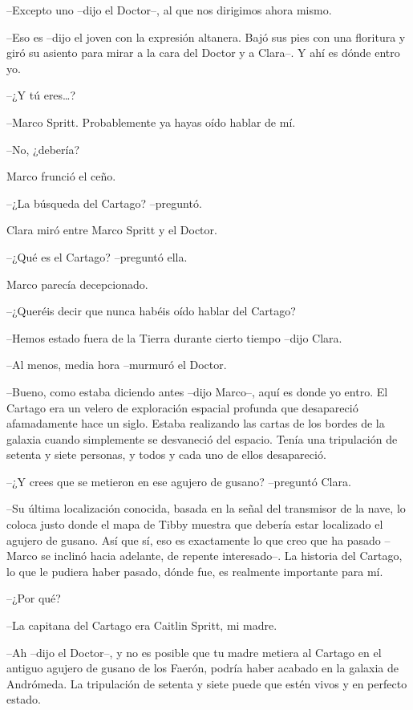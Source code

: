 {--Excepto uno --dijo el Doctor--, al que nos dirigimos ahora mismo.}

{--Eso es --dijo el joven con la expresión altanera. Bajó sus pies con
 una floritura y giró su asiento para mirar a la cara del Doctor y a
Clara--. Y ahí es dónde entro yo.}

{--¿Y tú eres\ldots{}?}

{--Marco Spritt. Probablemente ya hayas oído hablar de mí.}

{--No, ¿debería?}

{Marco frunció el ceño.}

{--¿La búsqueda del Cartago? --preguntó.}

{Clara miró entre Marco Spritt y el Doctor.}

{--¿Qué es el Cartago? --preguntó ella.}

{Marco parecía decepcionado.}

{--¿Queréis decir que nunca habéis oído hablar del Cartago?}

{--Hemos estado fuera de la Tierra durante cierto tiempo --dijo Clara.}

{--Al menos, media hora --murmuró el Doctor.}

{--Bueno, como estaba diciendo antes --dijo Marco--, aquí es donde yo
 entro. El Cartago era un velero de exploración espacial profunda que
 desapareció afamadamente hace un siglo. Estaba realizando las cartas de
 los bordes de la galaxia cuando simplemente se desvaneció del espacio.
 Tenía una tripulación de setenta y siete personas, y todos y cada uno de
ellos desapareció.}

{--¿Y crees que se metieron en ese agujero de gusano? --preguntó Clara.}

{--Su última localización conocida, basada en la señal del transmisor de
 la nave, lo coloca justo donde el mapa de Tibby muestra que debería
 estar localizado el agujero de gusano. Así que sí, eso es exactamente lo
 que creo que ha pasado --Marco se inclinó hacia adelante, de repente
 interesado--. La historia del Cartago, lo que le pudiera haber pasado,
dónde fue, es realmente importante para mí.}

{--¿Por qué?}

{--La capitana del Cartago era Caitlin Spritt, mi madre.}

{--Ah --dijo el Doctor--, y no es posible que tu madre metiera al Cartago
 en el antiguo agujero de gusano de los Faerón, podría haber acabado en
 la galaxia de Andrómeda. La tripulación de setenta y siete puede que
estén vivos y en perfecto estado.}

